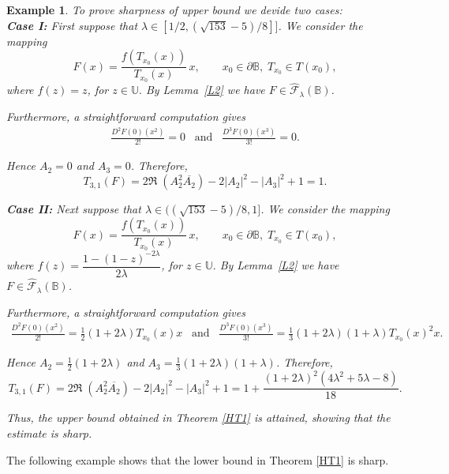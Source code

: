 \documentclass[11pt, reqno]{amsart}
\newtheorem{exm}{Example}[section]
\numberwithin{equation}{section}
\newcommand{\beas}{\begin{eqnarray*}}
\newcommand{\eeas}{\end{eqnarray*}}
\begin{document}
\begin{exm} To prove sharpness of upper bound we devide two cases:\\

{\bf Case I:} First suppose that  $\lambda\in [1/2,(\sqrt{153}-5)/8]]$. We consider the mapping
\[
F(x)=
\frac{f\!\left(T_{x_0}(x)\right)}{T_{x_0}(x)}\,x,
\qquad
x_0\in\partial\mathbb{B},\;
T_{x_0}\in T(x_0),
\]
where $f(z)=z$, for $z\in\mathbb{U}.$
By Lemma~\ref{L2} we have $F\in \widehat{\mathcal{F}}_{\lambda}(\mathbb{B})$. 


Furthermore, a straightforward computation gives
\beas
\frac{D^2F(0)(x^2)}{2!}=0
\;\;\;\text{and}\;\;\;\frac{D^3F(0)(x^3)}{3!}
=0.
\eeas

Hence $A_2=0$ and $A_3=0$. 
Therefore,
\[
T_{3,1}(F)
=2\Re\;(A_2^2\overline{A_2})-2|A_2|^2-|A_3|^2+1=1.\]

\medskip

{\bf Case II:} Next suppose that  $\lambda\in ((\sqrt{153}-5)/8,1]$. We consider the mapping
\[
F(x)=
\frac{f\!\left(T_{x_0}(x)\right)}{T_{x_0}(x)}\,x,
\qquad
x_0\in\partial\mathbb{B},\;
T_{x_0}\in T(x_0),
\]
where $f(z)=\dfrac{1-(1-z)^{-2\lambda}}{2\lambda}$, for $z\in\mathbb{U}.$
By Lemma~\ref{L2} we have $F\in \widehat{\mathcal{F}}_{\lambda}(\mathbb{B})$. 


Furthermore, a straightforward computation gives
\beas
\frac{D^2F(0)(x^2)}{2!}=\frac{1}{2}(1+2\lambda)T_{x_0}(x)x
\;\;\;\text{and}\;\;\;\frac{D^3F(0)(x^3)}{3!}
=\frac{1}{3}(1+2\lambda)(1+\lambda)T_{x_0}(x)^2x.
\eeas

Hence $A_2=\frac{1}{2}(1+2\lambda)$ and $A_3=\frac{1}{3}(1+2\lambda)(1+\lambda)$. 
Therefore,
\[
T_{3,1}(F)
=2\Re\;(A_2^2\overline{A_2})-2|A_2|^2-|A_3|^2+1=1+\frac{(1+2\lambda)^2(4\lambda^2+5\lambda-8)}{18}.\]

Thus, the upper bound obtained in Theorem \ref{HT1} is attained, showing that the estimate is sharp.\\


\end{exm}

The following example shows that the lower bound in Theorem \ref{HT1} is sharp.
\end{document}
